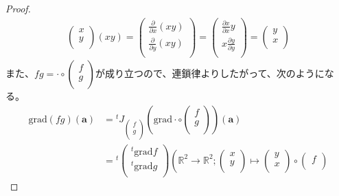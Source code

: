 \documentclass[dvipdfmx]{jsarticle}
\begin{document}
\begin{proof}
\begin{align*}
{\begin{pmatrix}
x \\
y \\
\end{pmatrix}}(xy) = \begin{pmatrix}
\frac{\partial}{\partial x}(xy) \\
\frac{\partial}{\partial y}(xy) \\
\end{pmatrix} = \begin{pmatrix}
\frac{\partial x}{\partial x}y \\
x\frac{\partial y}{\partial y} \\
\end{pmatrix} = \begin{pmatrix}
y \\
x \\
\end{pmatrix}
\end{align*}
また、$fg = \cdot \circ \begin{pmatrix}
f \\
g \\
\end{pmatrix}$が成り立つので、連鎖律よりしたがって、次のようになる。
\begin{align*}
\mathrm{grad}(fg)\left( \mathbf{a} \right) &={}^{t}J_{\begin{pmatrix}
f \\
g \\
\end{pmatrix}}\left( \mathrm{grad} \cdot \circ \begin{pmatrix}
f \\
g \\
\end{pmatrix} \right)\left( \mathbf{a} \right)\\
&={}^{t}\begin{pmatrix}
{}^{t}\mathrm{grad}f \\
{}^{t}\mathrm{grad}g \\
\end{pmatrix}\left( \mathbb{R}^{2} \rightarrow \mathbb{R}^{2};\begin{pmatrix}
x \\
y \\
\end{pmatrix} \mapsto \begin{pmatrix}
y \\
x \\
\end{pmatrix} \circ \begin{pmatrix}
f \\

\end{pmatrix}
\end{align*}
\end{proof}
\end{document}
